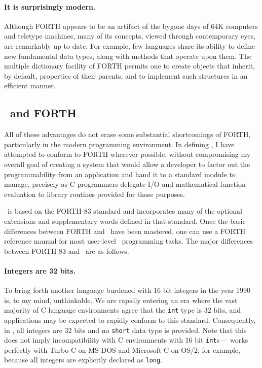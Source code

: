 \documentclass[twocolumn]{article}
\begin{document}
\paragraph{It is surprisingly modern.}  Although FORTH appears to be
an artifact of the bygone days of 64K computers and teletype machines,
many of its concepts, viewed through contemporary eyes, are remarkably
up to date.  For example, few languages share its ability to define
new fundamental data types, along with methods that operate upon
them.  The multiple dictionary facility of FORTH permits one to create
objects that inherit, by default, properties of their parents, and to
implement such structures in an efficient manner.

\subsection{\atlast\ and FORTH}

All of these advantages do not erase some substantial shortcomings of
FORTH, particularly in the modern programming environment.  In
defining \atlast , I have attempted to conform to FORTH wherever possible,
without compromising my overall goal of creating a system that would
allow a developer to factor out the programmability from an
application and hand it to a standard module to manage, precisely as
C programmers delegate I/O and mathematical function evaluation to
library routines provided for those purposes.

\atlast\ is based on the FORTH-83 standard and incorporates many of the
optional extensions and supplementary words defined in that standard.
Once the basic differences between FORTH and \atlast\ have been
mastered, one can use a FORTH reference manual for most user-level
\atlast\ programming tasks.  The major differences between FORTH-83 and
\atlast\ are as follows.

\paragraph{Integers are 32 bits.}  To bring forth another language
burdened with 16 bit integers in the year 1990 is, to my mind,
unthinkable.  We are rapidly entering an era where the vast
majority of C language environments agree that the {\tt int} type is
32 bits, and applications may be expected to rapidly conform to this
standard.  Consequently, in \atlast, all integers are 32 bits and no
{\tt short} data type is provided.  Note that this does not imply
incompatibility with C environments with 16 bit {\tt int}s---\atlast\
works perfectly with Turbo C on MS-DOS and Microsoft C on OS/2, for
example, because all integers are explicitly declared as {\tt long}.
\end{document}
